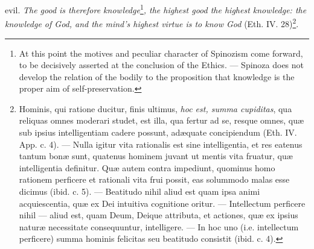 \documentclass[12pt,a4paper,openany]{book}
\begin{document}
evil. \emph{The good is therefore knowledge}\footnote{At this point the motives and peculiar character of Spinozism
come forward, to be decisively asserted at the conclusion of the Ethics. --- Spinoza does not develop the relation of the bodily to the proposition
that knowledge is the proper aim of self-preservation.}\emph{, the
highest good the highest knowledge: the
knowledge of God, and the mind's highest virtue is to
know God} (Eth. IV. 28)\footnote{Hominis, qui ratione ducitur, finis ultimus, \emph{hoc est, summa cupiditas},
qua reliquas omnes moderari studet, est illa, qua fertur
ad se, resque omnes, quæ sub ipsius intelligentiam cadere possunt,
adæquate concipiendum (Eth. IV. App. c. 4). --- Nulla igitur vita
rationalis est sine intelligentia, et res eatenus tantum bonæ sunt,
quatenus hominem juvant ut mentis vita fruatur, quæ intelligentia
definitur. Quæ autem contra impediunt, quominus homo rationem
perficere et rationali vita frui possit, eas solummodo malas esse
dicimus (ibid. c. 5). --- Beatitudo nihil aliud est quam ipsa animi
acquiescentia, quæ ex Dei intuitiva cognitione oritur. --- Intellectum
perficere nihil --- aliud est, quam Deum, Deique attributa, et actiones,
quæ ex ipsius naturæ necessitate consequuntur, intelligere. --- In hoc uno (i.e. intellectum perficere) summa hominis felicitas
seu beatitudo consistit (ibid. c. 4).}.
\end{document}
